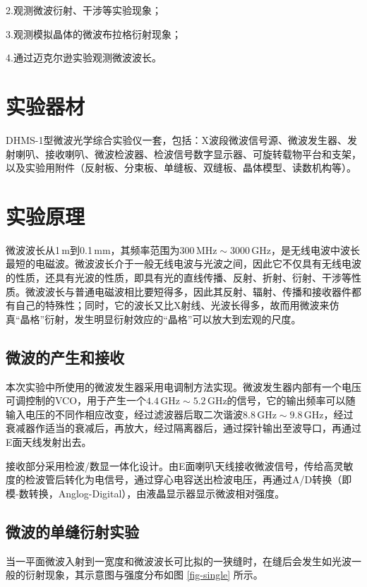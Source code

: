 \documentclass[UTF8]{article}
\theoremstyle{MyLineTheoremStyle} %
\theoremstyle{MyBlockTheoremStyle} %
\theoremstyle{MySubsubsectionStyle} %
\begin{document}
2.观测微波衍射、干涉等实验现象；

3.观测模拟晶体的微波布拉格衍射现象；

4.通过迈克尔逊实验观测微波波长。

\section{实验器材}
DHMS-1型微波光学综合实验仪一套，包括：X波段微波信号源、微波发生器、发射喇叭、接收喇叭、微波检波器、检波信号数字显示器、可旋转载物平台和支架，以及实验用附件（反射板、分束板、单缝板、双缝板、晶体模型、读数机构等）。

\section{实验原理}
微波波长从1\,m到0.1\,mm，其频率范围为$ 300\,\mathrm{MHz}\sim3000\,\mathrm{GHz} $，是无线电波中波长最短的电磁波。微波波长介于一般无线电波与光波之间，因此它不仅具有无线电波的性质，还具有光波的性质，即具有光的直线传播、反射、折射、衍射、干涉等性质。微波波长与普通电磁波相比要短得多，因此其反射、辐射、传播和接收器件都有自己的特殊性；同时，它的波长又比X射线、光波长得多，故而用微波来仿真“晶格”衍射，发生明显衍射效应的“晶格”可以放大到宏观的尺度。

\subsection{微波的产生和接收}
本次实验中所使用的微波发生器采用电调制方法实现。微波发生器内部有一个电压可调控制的VCO，用于产生一个$ 4.4\,\mathrm{GHz}\sim 5.2\,\mathrm{GHz} $的信号，它的输出频率可以随输入电压的不同作相应改变，经过滤波器后取二次谐波$ 8.8\,\mathrm{GHz}\sim9.8\,\mathrm{GHz} $，经过衰减器作适当的衰减后，再放大，经过隔离器后，通过探针输出至波导口，再通过E面天线发射出去。

接收部分采用检波/数显一体化设计。由E面喇叭天线接收微波信号，传给高灵敏度的检波管后转化为电信号，通过穿心电容送出检波电压，再通过A/D转换（即模-数转换，Anglog-Digital），由液晶显示器显示微波相对强度。

\subsection{微波的单缝衍射实验}
当一平面微波入射到一宽度和微波波长可比拟的一狭缝时，在缝后会发生如光波一般的衍射现象，其示意图与强度分布如图 \ref{fig-single} 所示。
\end{document}
